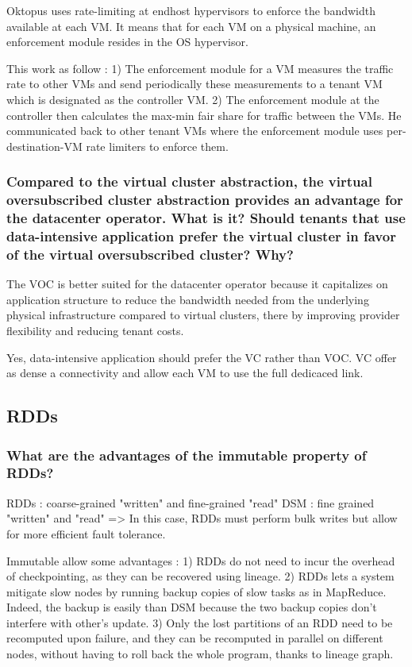 Oktopus uses rate-limiting at endhost hypervisors to enforce the bandwidth available at each VM. It means that for each VM on a physical machine, an enforcement module resides in the OS hypervisor.

This work as follow :
1) The enforcement module for a VM measures the traffic rate to other VMs and send periodically these measurements to a tenant VM which is designated as the controller VM.
2) The enforcement module at the controller then calculates the max-min fair share for traffic between the VMs. He communicated back to other tenant VMs where the enforcement module uses per-destination-VM rate limiters to enforce them.

\subsubsection*{Compared to the virtual cluster abstraction, the virtual oversubscribed cluster abstraction provides an advantage for the datacenter operator. What is it? Should tenants that use data-intensive application prefer the virtual cluster in favor of the virtual oversubscribed cluster? Why?}

The VOC is better suited for the datacenter operator because it capitalizes on application structure to reduce the bandwidth needed from the underlying physical infrastructure compared to virtual clusters, there by improving provider flexibility and reducing tenant costs.

Yes, data-intensive application should prefer the VC rather than VOC. VC offer as dense a connectivity and allow each VM to use the full dedicaced link.


\subsection{RDDs}

\subsubsection*{What are the advantages of the immutable property of
RDDs?}

RDDs : coarse-grained "written" and fine-grained "read"
DSM : fine grained "written" and "read"
=> In this case, RDDs must perform bulk writes but allow for more efficient fault tolerance. 

Immutable allow some advantages :
1) RDDs do not need to incur the overhead of checkpointing, as they can be recovered using lineage. 
2) RDDs lets a system mitigate slow nodes by running backup copies of slow tasks as in MapReduce. Indeed, the backup is easily than DSM because the two backup copies don't interfere with other's update.
3) Only the lost partitions of an RDD need to be recomputed upon failure, and they can be recomputed in parallel on different nodes, without having to roll back the whole program, thanks to lineage graph.

